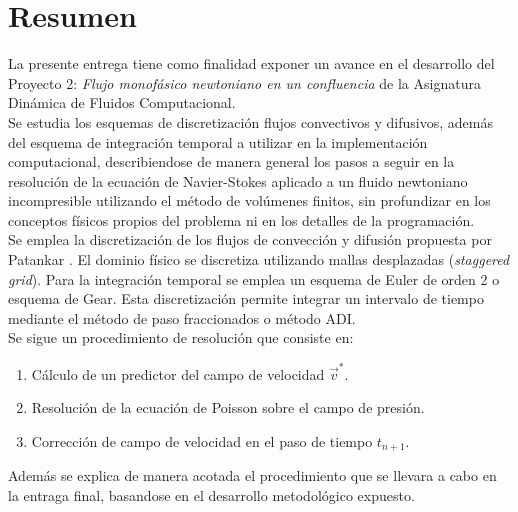 \section{Resumen}

La presente entrega tiene como finalidad exponer un avance en el desarrollo del Proyecto 2: \textit{Flujo monofásico newtoniano en un confluencia} de la Asignatura Dinámica de Fluidos Computacional. \\

Se estudia los esquemas de discretización flujos convectivos y difusivos, además  del esquema de integración temporal a utilizar en la implementación computacional, describiendose de manera general los pasos a seguir en la resolución de la ecuación de Navier-Stokes aplicado a un fluido newtoniano incompresible utilizando el método de volúmenes finitos, sin profundizar en los conceptos físicos propios del problema ni en los detalles de la programación.\\

Se emplea la discretización de los flujos de convección y difusión propuesta por Patankar \cite{patankar}. El dominio físico se discretiza utilizando mallas desplazadas (\textit{staggered grid}). Para la integración temporal se emplea un esquema de Euler de orden 2 o esquema de Gear. Esta discretización permite integrar un intervalo de tiempo mediante el método de paso fraccionados o método ADI.\\

Se sigue un procedimiento de resolución que consiste en:
\begin{enumerate}
\item Cálculo de un predictor del campo de velocidad $\vec{v}^*$.
\item Resolución de la ecuación de Poisson sobre el campo de presión.
\item Corrección de campo de velocidad en el paso de tiempo $t_{n+1}$.
\end{enumerate}

Además se explica de manera acotada el procedimiento que se llevara a cabo en la entraga final, basandose en el desarrollo metodológico expuesto. 

